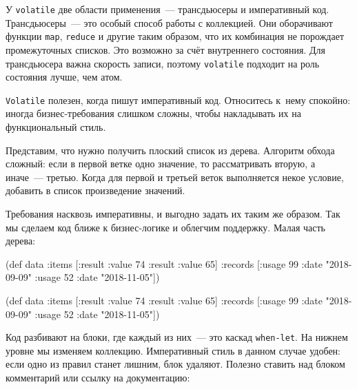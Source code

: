 У \verb|volatile| две области применения~--- трансдьюсеры и императивный
код. Трансдьюсеры~--- это особый способ работы с коллекцией. Они оборачивают функции
\verb|map|, \verb|reduce| и другие таким образом, что их комбинация не
порождает промежуточных списков. Это возможно за счёт внутреннего состояния. Для
трансдьюсера важна скорость записи, поэтому \verb|volatile| подходит на роль
состояния лучше, чем атом.

\verb|Volatile| полезен, когда пишут императивный код. Относитесь к~нему
спокойно: иногда бизнес-требования слишком сложны, чтобы накладывать их на
функциональный стиль.

Представим, что нужно получить плоский список из дерева. Алгоритм обхода
сложный: если в первой ветке одно значение, то рассматривать вторую, а иначе~---
третью. Когда для первой и третьей веток выполняется некое условие, добавить в
список произведение значений.


Требования насквозь императивны, и выгодно задать их таким же образом. Так мы
сделаем код ближе к бизнес-логике и облегчим поддержку. Малая часть дерева:

\ifx\DEVICETYPE\MOBILE

\begin{english}
  \begin{clojure}
(def data
  {:items [{:result {:value 74}}
           {:result {:value 65}}]
   :records [{:usage 99
              :date "2018-09-09"}
             {:usage 52
              :date "2018-11-05"}]})
  \end{clojure}
\end{english}

\else

\begin{english}
  \begin{clojure}
(def data
  {:items [{:result {:value 74}}
           {:result {:value 65}}]
   :records [{:usage 99 :date "2018-09-09"}
             {:usage 52 :date "2018-11-05"}]})
  \end{clojure}
\end{english}

\fi

Код разбивают на блоки, где каждый из них~--- это каскад \verb|when-let|. На
нижнем уровне мы изменяем коллекцию. Императивный стиль в данном случае удобен:
если одно из правил станет лишним, блок удаляют. Полезно ставить над блоком
комментарий или ссылку на документацию:

\ifx\DEVICETYPE\MOBILE

